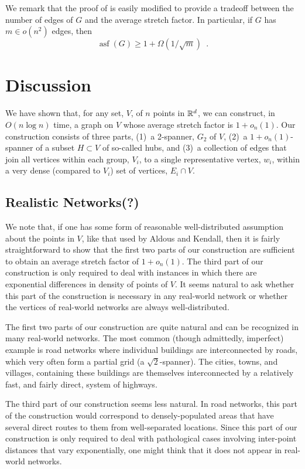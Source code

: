 \documentclass{patmorin}
\DeclareMathOperator{\asf}{asf}
\begin{document}
We remark that the proof of  is easily modified to
provide a tradeoff between the number of edges of $G$ and the average
stretch factor.  In particular, if $G$ has $m\in o(n^2)$ edges, then
\[
   \asf(G) \ge 1 + \Omega(1/\sqrt{m}) \enspace .
\]

\section{Discussion}

We have shown that, for any set, $V$, of $n$ points in $\mathbb{R}^d$, we can
construct, in $O(n\log n)$ time, a graph on $V$ whose average stretch
factor is $1+o_n(1)$.  Our construction consists of three parts, (1)~a
2-spanner, $G_2$ of $V$, (2)~a $1+o_n(1)$-spanner of a subset $H\subset V$
of so-called hubs, and (3)~a collection of edges that join all vertices
within each group, $V_i$, to a single representative vertex, $w_i$,
within a very dense (compared to $V_i$) set of vertices, $E_i\cap V$.

\subsection{Realistic Networks(?)}

We note that, if one has some form of reasonable well-distributed
assumption about the points in $V$, like that used by Aldous and Kendall,
then it is fairly straightforward to show that the first two parts of
our construction are sufficient to obtain an average stretch factor
of $1+o_n(1)$. The third part of our construction is only required
to deal with instances in which there are exponential differences in
density of points of $V$.  It seems natural to ask whether this part
of the construction is necessary in any real-world network or whether
the vertices of real-world networks are always well-distributed.

The first two parts of our construction are quite natural and can be
recognized in many real-world networks.  The most common (though admittedly,
imperfect) example is road networks where individual buildings are
interconnected by roads, which very often form a partial grid (a
$\sqrt{2}$-spanner). The cities, towns, and villages, containing these
buildings are themselves interconnected by a relatively fast, and fairly
direct, system of highways.

The third part of our construction seems less natural.  In road networks,
this part of the construction would correspond to densely-populated
areas that have several direct routes to them from well-separated
locations.  Since this part of our construction is only required to
deal with pathological cases involving inter-point distances that vary
exponentially, one might think that it does not appear in real-world
networks.
\end{document}
